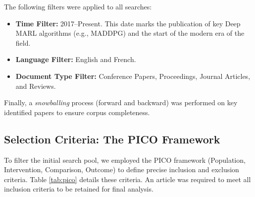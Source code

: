 \documentclass[conference]{IEEEtran}
\begin{document}
The following filters were applied to all searches:
\begin{itemize}
    \item \textbf{Time Filter:} 2017--Present. This date marks the publication of key Deep MARL algorithms (e.g., MADDPG) and the start of the modern era of the field.
    \item \textbf{Language Filter:} English and French.
    \item \textbf{Document Type Filter:} Conference Papers, Proceedings, Journal Articles, and Reviews.
\end{itemize}

Finally, a \textit{snowballing} process (forward and backward) was performed on key identified papers to ensure corpus completeness.

\subsection{Selection Criteria: The PICO Framework}

To filter the initial search pool, we employed the PICO framework (Population, Intervention, Comparison, Outcome) to define precise inclusion and exclusion criteria. Table \ref{tab:pico} details these criteria. An article was required to meet all inclusion criteria to be retained for final analysis.
\end{document}
